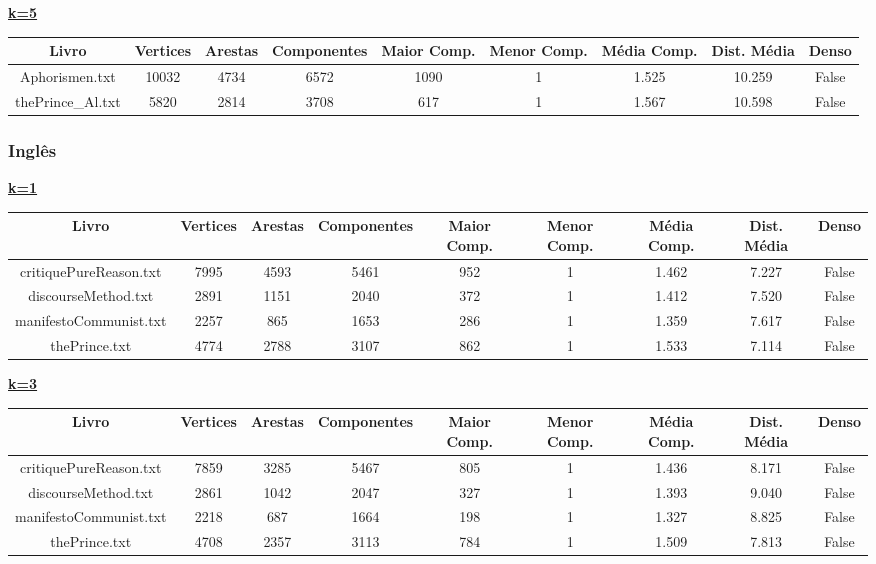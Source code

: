 \documentclass[12pt]{article}
\newcommand{\mytitle}[1]{\textbf{\underline{#1}}}
\begin{document}
\noindent\mytitle{k=5}
\begin{center}
\begin{tabular}{||c | c | c | c | c | c | c | c | c||}
\hline
Livro & Vertices & Arestas & Componentes & Maior Comp. & Menor Comp. & Média Comp. & Dist. Média & Denso \\ [0.5ex]
\hline\hline
Aphorismen.txt & 10032 & 4734 & 6572 & 1090 & 1 & 1.525 & 10.259 & False \\
\hline
thePrince\_Al.txt & 5820 & 2814 & 3708 & 617 & 1 & 1.567 & 10.598 & False \\
\hline
\end{tabular}
\end{center}


\subsubsection{Inglês}

\noindent\mytitle{k=1}
\begin{center}
\begin{tabular}{||c | c | c | c | c | c | c | c | c||}
\hline
Livro & Vertices & Arestas & Componentes & Maior Comp. & Menor Comp. & Média Comp. & Dist. Média & Denso \\ [0.5ex]
\hline\hline
critiquePureReason.txt & 7995 & 4593 & 5461 & 952 & 1 & 1.462 & 7.227 & False \\
\hline
discourseMethod.txt & 2891 & 1151 & 2040 & 372 & 1 & 1.412 & 7.520 & False \\
\hline
manifestoCommunist.txt & 2257 & 865 & 1653 & 286 & 1 & 1.359 & 7.617 & False \\
\hline
thePrince.txt & 4774 & 2788 & 3107 & 862 & 1 & 1.533 & 7.114 & False \\
\hline
\end{tabular}
\end{center}

\noindent\mytitle{k=3}
\begin{center}
\begin{tabular}{||c | c | c | c | c | c | c | c | c||}
\hline
Livro & Vertices & Arestas & Componentes & Maior Comp. & Menor Comp. & Média Comp. & Dist. Média & Denso \\ [0.5ex]
\hline\hline
critiquePureReason.txt & 7859 & 3285 & 5467 & 805 & 1 & 1.436 & 8.171 & False \\
\hline
discourseMethod.txt & 2861 & 1042 & 2047 & 327 & 1 & 1.393 & 9.040 & False \\
\hline
manifestoCommunist.txt & 2218 & 687 & 1664 & 198 & 1 & 1.327 & 8.825 & False \\
\hline
thePrince.txt & 4708 & 2357 & 3113 & 784 & 1 & 1.509 & 7.813 & False \\
\hline
\end{tabular}
\end{center}
\end{document}
